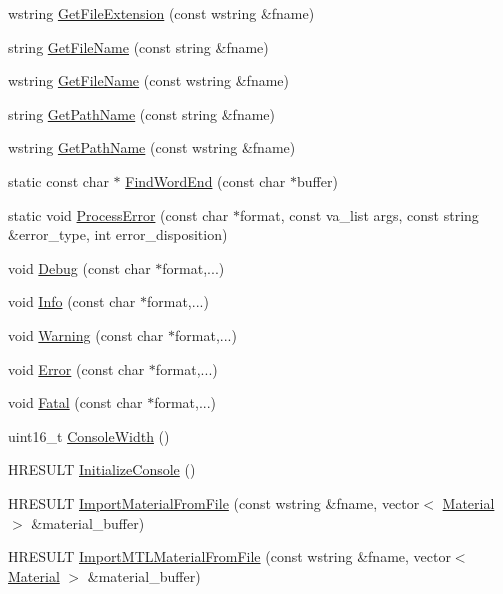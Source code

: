 \begin{DoxyCompactItemize}
\item 
wstring \hyperlink{namespacemage_ac95841e5c563311d50ef3524d5b7a8d8}{Get\+File\+Extension} (const wstring \&fname)
\item 
string \hyperlink{namespacemage_a83a9b478d1384147e758cd2edcd152a3}{Get\+File\+Name} (const string \&fname)
\item 
wstring \hyperlink{namespacemage_a04f348f48418c554940a817835b7a0c4}{Get\+File\+Name} (const wstring \&fname)
\item 
string \hyperlink{namespacemage_ac5c99281501e7af99e9fd0c332f0e113}{Get\+Path\+Name} (const string \&fname)
\item 
wstring \hyperlink{namespacemage_a171139f90ae3facdae52a61d5d73ddfa}{Get\+Path\+Name} (const wstring \&fname)
\item 
static const char $\ast$ \hyperlink{namespacemage_a81ebde51f9da00dd6fad364a2c5017cb}{Find\+Word\+End} (const char $\ast$buffer)
\item 
static void \hyperlink{namespacemage_a12282bdc04d00e024c5ddf93ed9ad785}{Process\+Error} (const char $\ast$format, const va\+\_\+list args, const string \&error\+\_\+type, int error\+\_\+disposition)
\item 
void \hyperlink{namespacemage_a1bcf1f0301e170105908eee5b5c46830}{Debug} (const char $\ast$format,...)
\item 
void \hyperlink{namespacemage_add6aa5f13960ce07b20f48d273956a91}{Info} (const char $\ast$format,...)
\item 
void \hyperlink{namespacemage_a0eccd8065c75d5f2bf86b48a5be3bfe5}{Warning} (const char $\ast$format,...)
\item 
void \hyperlink{namespacemage_a52a7fe8c9ce39afd9e0b0299373db0fa}{Error} (const char $\ast$format,...)
\item 
void \hyperlink{namespacemage_aefd40c91591a8e0423e4222b4a5e6249}{Fatal} (const char $\ast$format,...)
\item 
uint16\+\_\+t \hyperlink{namespacemage_a2988e0e46e373691a189ea97135f1ed1}{Console\+Width} ()
\item 
H\+R\+E\+S\+U\+LT \hyperlink{namespacemage_a14798232aabfdf96d751f4fcca4e6ece}{Initialize\+Console} ()
\item 
H\+R\+E\+S\+U\+LT \hyperlink{namespacemage_a3dd35a33d61f2891a717b5958f7edf12}{Import\+Material\+From\+File} (const wstring \&fname, vector$<$ \hyperlink{structmage_1_1_material}{Material} $>$ \&material\+\_\+buffer)
\item 
H\+R\+E\+S\+U\+LT \hyperlink{namespacemage_a7d8de4109ffc72a7a320e4ec642bddef}{Import\+M\+T\+L\+Material\+From\+File} (const wstring \&fname, vector$<$ \hyperlink{structmage_1_1_material}{Material} $>$ \&material\+\_\+buffer)

\end{DoxyCompactItemize}
